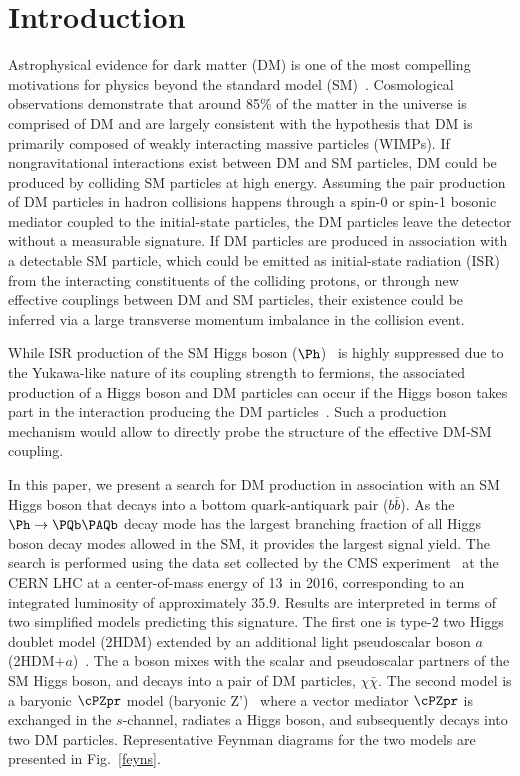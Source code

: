 \section{Introduction} \label{intro}

Astrophysical evidence for dark matter (DM) is one of the most compelling motivations for
physics beyond the standard model
(SM)~\cite{dm1,dm2,dm3}. Cosmological observations demonstrate that
around 85\% of the matter in the universe is comprised of DM
\cite{planck} and are largely consistent with the hypothesis that DM is primarily composed of
weakly interacting massive particles (WIMPs). If nongravitational
interactions exist between DM and SM particles, DM could be produced
by colliding SM particles at high energy. Assuming the pair
production of DM particles in hadron collisions happens through a
spin-0 or spin-1 bosonic mediator coupled to the initial-state particles, the DM particles leave the
detector without a measurable signature. If DM particles are produced in association with a detectable SM particle, which could be emitted
as initial-state radiation (ISR) from the interacting constituents of the colliding protons, or through
new effective couplings between DM and SM particles, their
existence could be inferred via a large transverse momentum imbalance in the collision event. 


While ISR production of the SM Higgs boson ($\Ph$)~\cite{HiggsObs_ATLAS, HiggsObs_CMS, HiggsObs_CMS_Long} is highly suppressed due to the Yukawa-like nature of its coupling strength to fermions, the associated production of a Higgs boson and DM particles
can occur if the
Higgs boson takes part in the interaction producing the DM particles~\cite{monoHiggs3,2HDM,PhysRevD.89.075017}.
Such a production mechanism would allow to directly probe the structure of the effective DM-SM coupling.

In this paper, we  present a search for DM production in association
with an SM Higgs boson that decays into a bottom quark-antiquark pair ($b\bar{b}$). As the 
$\Ph\rightarrow \bb$ decay mode has the largest branching fraction of all Higgs boson decay modes allowed in the SM, it provides the largest signal yield. The search is performed using the data set collected by the CMS experiment~\cite{CMSdetector} at the CERN LHC at a center-of-mass energy of 13\TeV~in 2016, corresponding to an integrated luminosity of approximately 35.9\fbinv. Results are interpreted in terms of two simplified models predicting this signature. The first one is type-2 two Higgs doublet model (2HDM) extended by an additional light pseudoscalar boson $a$ (2HDM+$a$)~\cite{Bauer2017}. The a boson mixes with the scalar and pseudoscalar partners of the SM Higgs boson, and decays into a pair of DM particles,  $\chi\bar{\chi}$. The second model is a baryonic $\cPZpr$ model (baryonic Z')~\cite{PhysRevD.89.075017} where a vector mediator $\cPZpr$ is exchanged in the $s$-channel, radiates a Higgs boson, and subsequently decays into two DM 
particles. Representative Feynman diagrams for the two models are presented in Fig.~\ref{feyns}.


